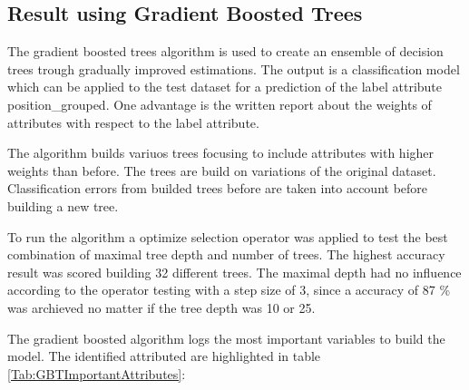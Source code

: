 \subsection{Result using Gradient Boosted Trees}

The gradient boosted trees algorithm is used to create an ensemble of decision trees trough gradually improved estimations. The output is a classification model which can be applied to the test dataset for a prediction of the label attribute position\_grouped. \newline
One advantage is the written report about the weights of attributes with respect to the label attribute.~\cite{ref_rapidminergbt}

The algorithm builds variuos trees focusing to include attributes with higher weights than before. The trees are build on variations of the original dataset. Classification errors from builded trees before are taken into account before building a new tree. ~\cite{ref_towardsGBT}

To run the algorithm a optimize selection operator was applied to test the best combination of maximal tree depth and number of trees. The highest accuracy result was scored building 32 different trees. The maximal depth had no influence according to the operator testing with a step size of 3, since a accuracy of 87 \% was archieved no matter if the tree depth was 10 or 25. 

The gradient boosted algorithm logs the most important variables to build the model. The identified attributed are highlighted in table \ref{Tab:GBTImportantAttributes}:

